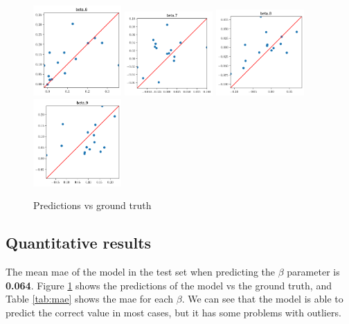 \begin{figure}
    \includegraphics[width=0.3\textwidth]{files/plots/scatter/beta_6.png}
    \includegraphics[width=0.3\textwidth]{files/plots/scatter/beta_7.png}
    \includegraphics[width=0.3\textwidth]{files/plots/scatter/beta_8.png}
    \includegraphics[width=0.3\textwidth]{files/plots/scatter/beta_9.png}
    \caption{Predictions vs ground truth}
    \label{fig:scatter}
\end{figure}

\subsection{Quantitative results}

The mean \gls{mae} of the model in the test set when predicting the $\beta$
parameter is \textbf{0.064}. Figure \ref{fig:scatter} shows the predictions of
the model vs the ground truth, and Table \ref{tab:mae} shows the \gls{mae} for
each $\beta$. We can see that the model is able to predict the correct value in
most cases, but it has some problems with outliers.

